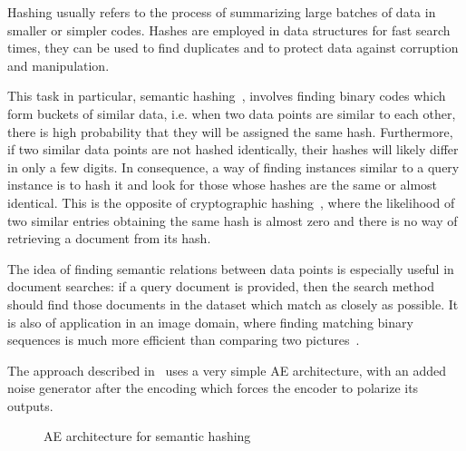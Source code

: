 \documentclass[
	fontsize=11pt, %
	twoside=false, %
	open=any, %
	secnumdepth=1, %
]{kaobook}
\begin{document}
Hashing usually refers to the process of summarizing large batches of data in smaller or simpler codes. Hashes are employed in data structures for fast search times, they can be used to find duplicates and to protect data against corruption and manipulation.

This task in particular, semantic hashing~\cite{salakhutdinov}, involves finding binary codes which form buckets of similar data, i.e. when two data points are similar to each other, there is high probability that they will be assigned the same hash. Furthermore, if two similar data points are not hashed identically, their hashes will likely differ in only a few digits. In consequence, a way of finding instances similar to a query instance is to hash it and look for those whose hashes are the same or almost identical. This is the opposite of cryptographic hashing~\cite{katz2014introduction}, where the likelihood of two similar entries obtaining the same hash is almost zero and there is no way of retrieving a document from its hash.

The idea of finding semantic relations between data points is especially useful in document searches: if a query document is provided, then the search method should find those documents in the dataset which match as closely as possible. It is also of application in an image domain, where finding matching binary sequences is much more efficient than comparing two pictures~\cite{carreira2015}.

The approach described in~\cite{salakhutdinov} uses a very simple AE architecture, with an added noise generator after the encoding which forces the encoder to polarize its outputs. 



\begin{figure}[ht]
    \centering\small
    \caption{AE architecture for semantic hashing}
    \label{fig:semantic}
\end{figure}
\end{document}
